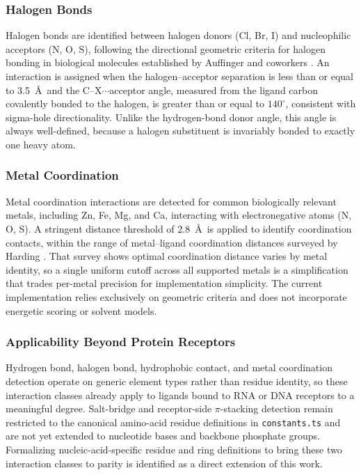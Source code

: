 \documentclass[lettersize,journal]{IEEEtran}
\begin{document}
\subsubsection{Halogen Bonds}
Halogen bonds are identified between halogen donors (Cl, Br, I) and nucleophilic acceptors (N, O, S), following the directional geometric criteria for halogen bonding in biological molecules established by Auffinger and coworkers \cite{auffinger2004halogenbonds}. An interaction is assigned when the halogen–acceptor separation is less than or equal to 3.5~\AA\ and the C–X$\cdots$acceptor angle, measured from the ligand carbon covalently bonded to the halogen, is greater than or equal to $140^{\circ}$, consistent with sigma-hole directionality. Unlike the hydrogen-bond donor angle, this angle is always well-defined, because a halogen substituent is invariably bonded to exactly one heavy atom.

\subsubsection{Metal Coordination}
Metal coordination interactions are detected for common biologically relevant metals, including Zn, Fe, Mg, and Ca, interacting with electronegative atoms (N, O, S). A stringent distance threshold of 2.8~\AA\ is applied to identify coordination contacts, within the range of metal–ligand coordination distances surveyed by Harding \cite{harding2001metalgeometry}. That survey shows optimal coordination distance varies by metal identity, so a single uniform cutoff across all supported metals is a simplification that trades per-metal precision for implementation simplicity. The current implementation relies exclusively on geometric criteria and does not incorporate energetic scoring or solvent models.

\subsubsection{Applicability Beyond Protein Receptors}
Hydrogen bond, halogen bond, hydrophobic contact, and metal coordination detection operate on generic element types rather than residue identity, so these interaction classes already apply to ligands bound to RNA or DNA receptors to a meaningful degree. Salt-bridge and receptor-side $\pi$-stacking detection remain restricted to the canonical amino-acid residue definitions in \texttt{constants.ts} and are not yet extended to nucleotide bases and backbone phosphate groups. Formalizing nucleic-acid-specific residue and ring definitions to bring these two interaction classes to parity is identified as a direct extension of this work.
\end{document}

